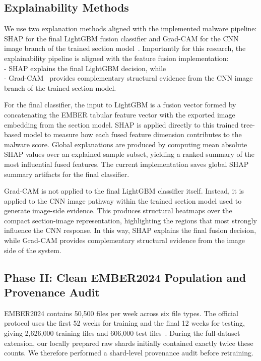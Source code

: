\documentclass[conference]{IEEEtran}
\begin{document}
\subsection{Explainability Methods}

We use two explanation methods aligned with the implemented malware pipeline: SHAP for the final LightGBM fusion classifier and Grad-CAM for the CNN image branch of the trained section model~\cite{LL2017,SCDVPB2017}.
Importantly for this research, the explainability pipeline is aligned with the feature fusion implementation:\\
- SHAP explains the final LightGBM decision, while\\
- Grad-CAM~\cite{LL2017,SCDVPB2017} provides complementary structural evidence from the CNN image branch of the trained section model.

For the final classifier, the input to LightGBM is a fusion vector formed by concatenating the EMBER tabular feature vector with the exported image embedding from the section model.
SHAP is applied directly to this trained tree-based model to measure how each fused feature dimension contributes to the malware score.
Global explanations are produced by computing mean absolute SHAP values over an explained sample subset, yielding a ranked summary of the most influential fused features.
The current implementation saves global SHAP summary artifacts for the final classifier.

Grad-CAM is not applied to the final LightGBM classifier itself.
Instead, it is applied to the CNN image pathway within the trained section model used to generate image-side evidence.
This produces structural heatmaps over the compact section-image representation, highlighting the regions that most strongly influence the CNN response.
In this way, SHAP explains the final fusion decision, while Grad-CAM provides complementary structural evidence from the image side of the system.



\subsection{Phase II: Clean EMBER2024 Population and Provenance Audit}
EMBER2024 contains 50,500 files per week across six file types. The official protocol uses the first 52 weeks for training and the final 12 weeks for testing, giving 2,626,000 training files and 606,000 test files~\cite{JMGPR2024,ember2024github}. During the full-dataset extension, our locally prepared raw shards initially contained exactly twice these counts. We therefore performed a shard-level provenance audit before retraining.
\end{document}
